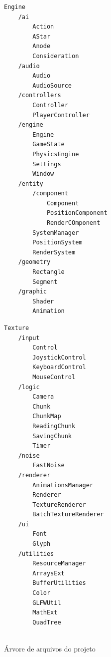 \documentclass[12pt, 
openright, 
oneside, 
a4paper,    
brazil]{facom-ufu-abntex2}
\begin{document}
\begin{figure}[ht!]
\begin{minipage}{.45\columnwidth}
  \begin{lstlisting}[frame=tlrb]
 Engine
    /ai
        Action
        AStar
        Anode
        Consideration
    /audio
        Audio
        AudioSource
    /controllers
        Controller
        PlayerController
    /engine
        Engine
        GameState
        PhysicsEngine
        Settings
        Window
    /entity
        /component
            Component
            PositionComponent
            RenderCOmponent
        SystemManager
        PositionSystem
        RenderSystem
    /geometry
        Rectangle
        Segment
    /graphic
        Shader
        Animation 
  \end{lstlisting}
\end{minipage}\hfill
\begin{minipage}{.45\columnwidth}
  \lstset{showlines=true}
  \begin{lstlisting}[frame=tlrb]
        Texture
    /input
        Control
        JoystickControl
        KeyboardControl
        MouseControl
    /logic
        Camera
        Chunk
        ChunkMap
        ReadingChunk
        SavingChunk
        Timer
    /noise
        FastNoise
    /renderer
        AnimationsManager
        Renderer
        TextureRenderer
        BatchTextureRenderer
    /ui
        Font
        Glyph
    /utilities
        ResourceManager
        ArraysExt
        BufferUtilities
        Color
        GLFWUtil
        MathExt
        QuadTree  
        
  \end{lstlisting}
\end{minipage}
\caption{Árvore de arquivos do projeto\label{fig:arv.arq}}
\end{figure}

\end{document}
